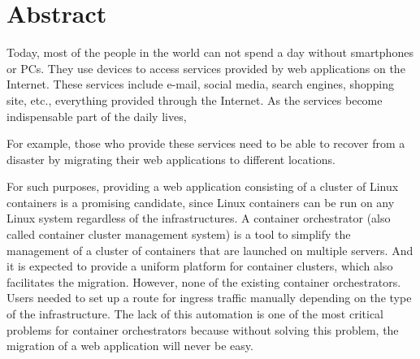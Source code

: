 \chapter*{Abstract}

Today, most of the people in the world can not spend a day without  smartphones or PCs.
They use  devices to access services provided by web applications on the Internet.
These services include e-mail, social media, search engines, shopping site, etc., everything provided through the Internet.
As the services become indispensable part of the daily lives, 

For example, those who provide these services need to be able to recover from a disaster by migrating their web applications to different locations.

For such purposes, providing a web application consisting of a cluster of Linux containers is a promising candidate, since Linux containers can be run on any Linux system regardless of the infrastructures.
A container orchestrator (also called container cluster management system) is a tool to simplify the management of a cluster of containers that are launched on multiple servers.
And it is expected to provide a uniform platform for container clusters, which also facilitates the migration.
However, none of the existing container orchestrators.
%
Users needed to set up a route for ingress traffic manually depending on the type of the infrastructure.
The lack of this  automation is one of the most critical problems for container orchestrators\added{,} because without solving this problem, the migration of a web application will never be easy.

